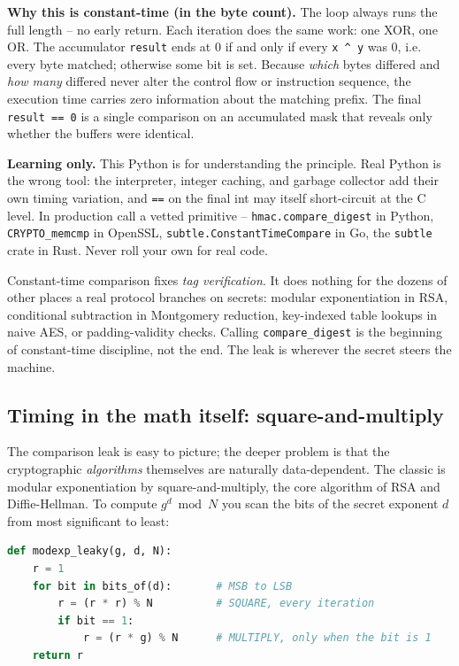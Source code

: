 \begin{implementbox}
\textbf{Why this is constant-time (in the byte count).} The loop always runs the full length -- no early return. Each iteration does the same work: one XOR, one OR. The accumulator \texttt{result} ends at $0$ if and only if every \texttt{x \^{} y} was $0$, i.e. every byte matched; otherwise some bit is set. Because \emph{which} bytes differed and \emph{how many} differed never alter the control flow or instruction sequence, the execution time carries zero information about the matching prefix. The final \texttt{result == 0} is a single comparison on an accumulated mask that reveals only whether the buffers were identical.

\textbf{Learning only.} This Python is for understanding the principle. Real Python is the wrong tool: the interpreter, integer caching, and garbage collector add their own timing variation, and \texttt{==} on the final int may itself short-circuit at the C level. In production call a vetted primitive -- \texttt{hmac.compare\_digest} in Python, \texttt{CRYPTO\_memcmp} in OpenSSL, \texttt{subtle.ConstantTimeCompare} in Go, the \texttt{subtle} crate in Rust. Never roll your own for real code.
\end{implementbox}

\begin{trapbox}
Constant-time comparison fixes \emph{tag verification}. It does nothing for the dozens of other places a real protocol branches on secrets: modular exponentiation in RSA, conditional subtraction in Montgomery reduction, key-indexed table lookups in naive AES, or padding-validity checks. Calling \texttt{compare\_digest} is the beginning of constant-time discipline, not the end. The leak is wherever the secret steers the machine.
\end{trapbox}

\subsection{Timing in the math itself: square-and-multiply}
\label{ch37:sqmul}

The comparison leak is easy to picture; the deeper problem is that the cryptographic \emph{algorithms} themselves are naturally data-dependent. The classic is modular exponentiation by square-and-multiply, the core algorithm of RSA and Diffie-Hellman. To compute $g^{d} \bmod N$ you scan the bits of the secret exponent $d$ from most significant to least:

\begin{lstlisting}[language=Python]
def modexp_leaky(g, d, N):
    r = 1
    for bit in bits_of(d):       # MSB to LSB
        r = (r * r) % N          # SQUARE, every iteration
        if bit == 1:
            r = (r * g) % N      # MULTIPLY, only when the bit is 1
    return r
\end{lstlisting}

